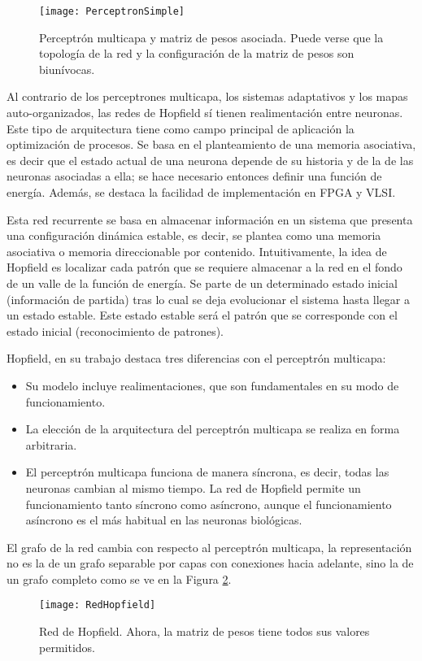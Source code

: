 \begin{figure}
	\centering
	\texttt{[image: PerceptronSimple]}\\
	\caption{Perceptrón multicapa y matriz de pesos asociada. Puede verse que la topología de la red y la configuración de la matriz de pesos son biunívocas.}\label{fig:PerceptronSimple}
\end{figure}

Al contrario de los perceptrones multicapa, los sistemas adaptativos y los mapas auto-organizados, las redes de Hopfield sí tienen realimentación entre neuronas.
Este tipo de arquitectura tiene como campo principal de aplicación la optimización de procesos.
Se basa en el planteamiento de una memoria asociativa, es decir que el estado actual de una neurona depende de su historia y de la de las neuronas asociadas a ella; se hace necesario entonces definir una función de energía.
Además, se destaca la facilidad de implementación en FPGA y VLSI.

Esta red recurrente se basa en almacenar información en un sistema que presenta una configuración dinámica estable, es decir, se plantea como una memoria asociativa o memoria direccionable por contenido.
Intuitivamente, la idea de Hopfield es localizar cada patrón que se requiere almacenar a la red en el fondo de un valle de la función de energía.
Se parte de un determinado estado inicial (información de partida) tras lo cual se deja evolucionar el sistema hasta llegar a un estado estable.
Este estado estable será el patrón que se corresponde con el estado inicial (reconocimiento de patrones).

Hopfield, en su trabajo destaca tres diferencias con el perceptrón multicapa:
\begin{itemize}
		\item Su modelo incluye realimentaciones, que son fundamentales en su modo de funcionamiento.
		\item La elección de la arquitectura del perceptrón multicapa se realiza en forma arbitraria.
		\item El perceptrón multicapa funciona de manera síncrona, es decir, todas las neuronas cambian al mismo tiempo. La red de Hopfield permite un funcionamiento tanto síncrono como asíncrono, aunque el funcionamiento asíncrono es el más habitual en las neuronas biológicas.
\end{itemize}

El grafo de la red cambia con respecto al perceptrón multicapa, la representación no es la de un grafo separable por capas con conexiones hacia adelante, sino la de un grafo completo como se ve en la Figura \ref{fig:RedHopfield}.
\begin{figure}
	\centering
	\texttt{[image: RedHopfield]}\\
	\caption{Red de Hopfield. Ahora, la matriz de pesos tiene todos sus valores permitidos.}\label{fig:RedHopfield}
\end{figure}

